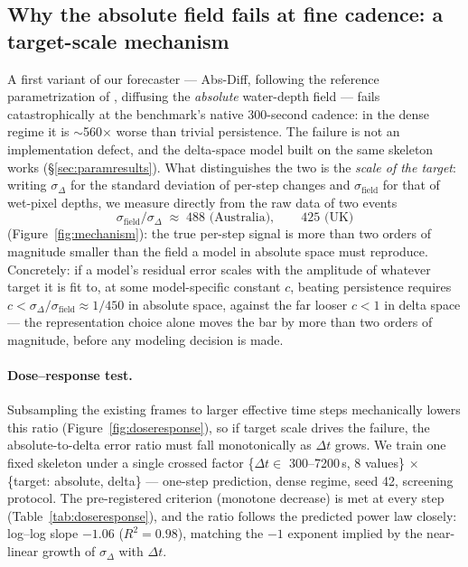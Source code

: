 \documentclass[11pt]{article}
\newcommand{\absdiff}{\mbox{Abs-Diff}}
\begin{document}
\subsection{Why the absolute field fails at fine cadence: a target-scale mechanism}
\label{sec:mechanism}
A first variant of our forecaster --- \absdiff{}, following the reference
parametrization of \citet{diffsparse2025}, diffusing the \emph{absolute}
water-depth field --- fails catastrophically at the benchmark's native
300-second cadence: in the dense regime it is $\sim$560$\times$ worse
than trivial persistence. The failure is not an implementation defect,
and the delta-space model built on the same skeleton works
(\S\ref{sec:paramresults}). What distinguishes the two is the
\emph{scale of the target}: writing $\sigma_\Delta$ for the standard
deviation of per-step changes and $\sigma_{\text{field}}$ for that of
wet-pixel depths, we measure directly from the raw data of two events
\begin{equation}
\sigma_{\text{field}} / \sigma_\Delta \;\approx\; 488 \text{ (Australia)}, \qquad 425 \text{ (UK)}
\end{equation}
(Figure~\ref{fig:mechanism}): the true per-step signal is more than two
orders of magnitude smaller than the field a model in absolute space must
reproduce. Concretely: if a model's residual error scales with the
amplitude of whatever target it is fit to, at some model-specific
constant $c$, beating persistence requires $c < \sigma_\Delta /
\sigma_{\text{field}} \approx 1/450$ in absolute space, against the far
looser $c < 1$ in delta space --- the representation choice alone moves
the bar by more than two orders of magnitude, before any modeling
decision is made.

\paragraph{Dose--response test.} Subsampling the existing frames to
larger effective time steps mechanically lowers this ratio
(Figure~\ref{fig:doseresponse}), so if target scale drives the failure,
the absolute-to-delta error ratio must fall monotonically as $\Delta t$
grows. We train one fixed skeleton under a single crossed factor
\{$\Delta t \in$ 300--7200\,s, 8 values\} $\times$ \{target: absolute,
delta\} --- one-step prediction, dense regime, seed 42, screening
protocol. The pre-registered criterion (monotone decrease) is met at
every step (Table~\ref{tab:doseresponse}), and the ratio follows the
predicted power law closely: log--log slope $-1.06$ ($R^2=0.98$),
matching the $-1$ exponent implied by the near-linear growth of
$\sigma_\Delta$ with $\Delta t$.
\end{document}
